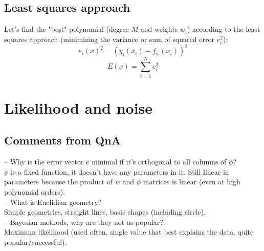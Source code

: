 \documentclass[a4paper,11pt]{article}
\begin{document}
	\subsection{Least squares approach}
	Let's find the "best" polynomial (degree $M$ and weights $w_i$) according to the least squares approach (minimizing the variance or sum of squared error $e_i^2$):
	\[e_i(x)^2=(y_i(x_i)-f_w(x_i))^2\]
	\[E(x)=\sum^N_{i=1} e_i^2\]
	
	
	
	
	\section{Likelihood and noise}
	\subsection{Comments from QnA}
	-- Why is the error vector $e$ minimal if it's orthogonal to all columns of $\phi$?\\
	$\phi$ is a fixed function, it doesn't have any parameters in it. Still linear in parameters because the product of $w$ and $\phi$ matrices is linear (even at high polynomial orders).\\
	-- What is Euclidian geometry?\\
	Simple geometries, straight lines, basic shapes (including circle).\\
	-- Bayesian methods, why are they not as popular?: \\
	Maximum likelihood (used often, single value that best explains the data, quite popular/successful).
\end{document}
